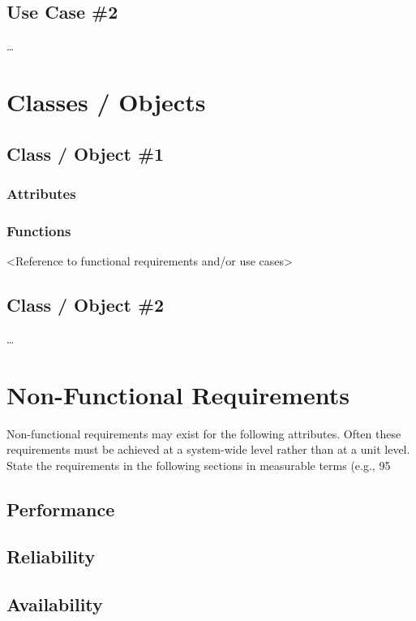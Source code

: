 \documentclass{scrreprt}
\begin{document}
		\subsection{Use Case \#2}
…
	\section{ Classes / Objects}

		\subsection{Class / Object \#1}

			\subsubsection{Attributes}

			\subsubsection{Functions}

<Reference to functional requirements and/or use cases>

		\subsection{Class / Object \#2}
…
	\section{ Non-Functional Requirements}
Non-functional requirements may exist for the following attributes.  Often these requirements must be achieved at a system-wide level rather than at a unit level.  State the requirements in the following sections in measurable terms (e.g., 95%
		\subsection{Performance}

		\subsection{Reliability}

		\subsection{Availability}
\end{document}
